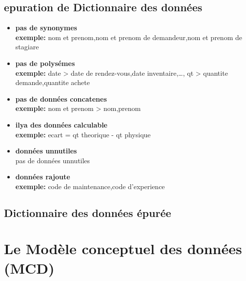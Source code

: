 \subsection{epuration de Dictionnaire des données}
\begin{itemize}
    \item \textbf{pas de synonymes} \\ \textbf{exemple:} nom et prenom,nom et prenom de demandeur,nom et prenom de stagiare
    \item \textbf{pas de polysémes} \\ \textbf{exemple:} date > date de rendez-vous,date inventaire,\dots, qt > quantite demande,quantite achete 
    \item \textbf{pas de données concatenes} \\\textbf{exemple:} nom et prenom > nom,prenom
    \item \textbf{ilya des données calculable} \\\textbf{exemple:} ecart = qt theorique - qt physique 
    \item \textbf{données unnutiles} \\ pas de données unnutiles
    \item \textbf{données rajoute} \\\textbf{exemple:} code de maintenance,code d'experience 
\end{itemize}
\subsection{Dictionnaire des données épurée}
\section{Le Modèle conceptuel des données (MCD)}
